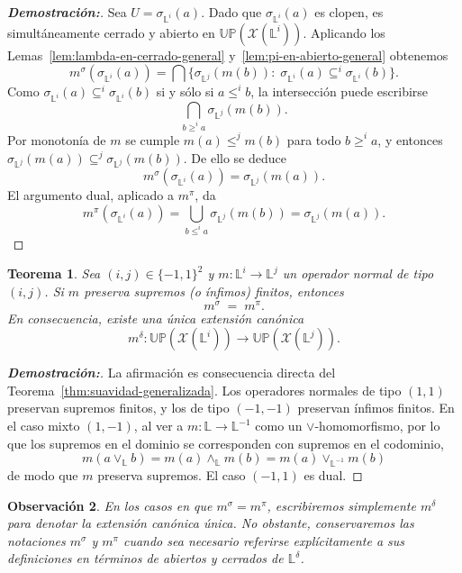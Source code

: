 \documentclass[12pt]{book}
\newtheorem{theorem}{Teorema}[section]
\newtheorem{remark}[theorem]{Observación}
\newcommand{\Up}{\mathbb{UP}}
\begin{document}
\begin{proof}[\textbf{Demostración:}]
Sea \(U=\sigma_{\mathbb{L}^i}(a)\).
Dado que \(\sigma_{\mathbb{L}^i}(a)\) es clopen, es simultáneamente cerrado y abierto
en \(\Up(\mathcal{X}(\mathbb{L}^i))\).
Aplicando los Lemas~\ref{lem:lambda-en-cerrado-general}
y~\ref{lem:pi-en-abierto-general} obtenemos
\[
  m^{\sigma}(\sigma_{\mathbb{L}^i}(a))
  = \bigcap\{
     \sigma_{\mathbb{L}^j}(m(b))
     :\;\sigma_{\mathbb{L}^i}(a)\subseteq^{i}\sigma_{\mathbb{L}^i}(b)
   \}.
\]
Como \(\sigma_{\mathbb{L}^i}(a)\subseteq^{i}\sigma_{\mathbb{L}^i}(b)\)
si y sólo si \(a\le^{i} b\),
la intersección puede escribirse
\[
  \bigcap_{b\ge^{i} a} \sigma_{\mathbb{L}^j}(m(b)).
\]
Por monotonía de \(m\) se cumple
\(m(a)\le^{j} m(b)\) para todo \(b\ge^{i}a\),
y entonces
\(\sigma_{\mathbb{L}^j}(m(a))
 \subseteq^{j}
 \sigma_{\mathbb{L}^j}(m(b))\).
De ello se deduce
\[
  m^{\sigma}(\sigma_{\mathbb{L}^i}(a))
  = \sigma_{\mathbb{L}^j}(m(a)).
\]
El argumento dual, aplicado a \(m^{\pi}\),
da
\[
  m^{\pi}(\sigma_{\mathbb{L}^i}(a))
  = \bigcup_{b\le^{i} a}\sigma_{\mathbb{L}^j}(m(b))
  = \sigma_{\mathbb{L}^j}(m(a)).
\]
\end{proof}

\begin{theorem}\label{teo:suavidad-ij}
Sea $(i,j)\in\{-1,1\}^2$ y
\(m\colon\mathbb L^i\to\mathbb L^j\)
un operador normal de tipo \((i,j)\).
Si \(m\) preserva supremos (o ínfimos) finitos, entonces
\[
  m^{\sigma} \;=\; m^{\pi}.
\]
En consecuencia, existe una única extensión canónica
\[
  m^\delta:
  \Up(\mathcal{X}(\mathbb{L}^i))
  \longrightarrow
  \Up(\mathcal{X}(\mathbb{L}^j)).
\]
\end{theorem}

\begin{proof}[\textbf{Demostración:}]
La afirmación es consecuencia directa del
Teorema~\ref{thm:suavidad-generalizada}.
Los operadores normales de tipo \((1,1)\)
preservan supremos finitos, y los de tipo \((-1,-1)\)
preservan ínfimos finitos.
En el caso mixto \((1,-1)\), al ver a 
\(m\colon\mathbb L\to\mathbb L^{-1}\) como un $\vee$-homomorfismo,
por lo que los supremos en el dominio se corresponden con supremos en el codominio,
\[
  m(a\vee_{\mathbb L}b)
= m(a)\wedge_{\mathbb L}m(b)
= m(a)\vee_{\mathbb L^{-1}}m(b)
\]
de modo que \(m\) preserva supremos.
El caso \((-1,1)\) es dual.
\end{proof}

\begin{remark}
En los casos en que \(m^{\sigma}=m^{\pi}\),
escribiremos simplemente \(m^{\delta}\) para denotar la
extensión canónica única.
No obstante, conservaremos las notaciones
\(m^{\sigma}\) y \(m^{\pi}\)
cuando sea necesario referirse explícitamente
a sus definiciones en términos de abiertos y cerrados de $\mathbb{L}^{\delta}$.
\end{remark}
\end{document}
